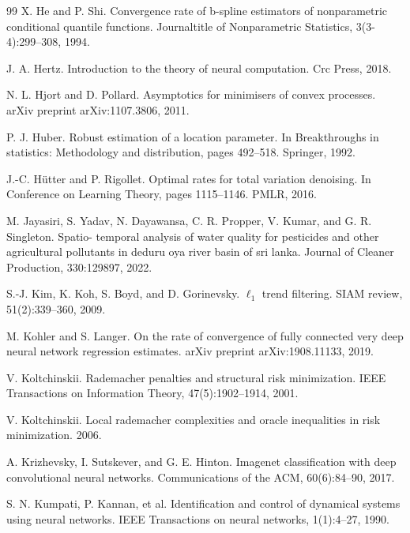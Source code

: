 \documentclass[twoside,11pt]{article}
\begin{document}
\begin{thebibliography}{99}
 X. He and P. Shi. Convergence rate of b-spline estimators of nonparametric conditional quantile functions. Journaltitle of Nonparametric Statistics, 3(3-4):299--308, 1994.

 J. A. Hertz. Introduction to the theory of neural computation. Crc Press, 2018.

 N. L. Hjort and D. Pollard. Asymptotics for minimisers of convex processes. arXiv preprint arXiv:1107.3806, 2011.

 P. J. Huber. Robust estimation of a location parameter. In Breakthroughs in statistics: Methodology and distribution, pages 492--518. Springer, 1992.

 J.-C. Hütter and P. Rigollet. Optimal rates for total variation denoising. In Conference on Learning Theory, pages 1115--1146. PMLR, 2016.

 M. Jayasiri, S. Yadav, N. Dayawansa, C. R. Propper, V. Kumar, and G. R. Singleton. Spatio- temporal analysis of water quality for pesticides and other agricultural pollutants in deduru oya river basin of sri lanka. Journal of Cleaner Production, 330:129897, 2022.

 S.-J. Kim, K. Koh, S. Boyd, and D. Gorinevsky. $\ell_1$ trend filtering. SIAM review, 51(2):339--360, 2009.

 M. Kohler and S. Langer. On the rate of convergence of fully connected very deep neural network regression estimates. arXiv preprint arXiv:1908.11133, 2019.

 V. Koltchinskii. Rademacher penalties and structural risk minimization. IEEE Transactions on Information Theory, 47(5):1902--1914, 2001.

 V. Koltchinskii. Local rademacher complexities and oracle inequalities in risk minimization. 2006.

 A. Krizhevsky, I. Sutskever, and G. E. Hinton. Imagenet classification with deep convolutional neural networks. Communications of the ACM, 60(6):84--90, 2017.

 S. N. Kumpati, P. Kannan, et al. Identification and control of dynamical systems using neural networks. IEEE Transactions on neural networks, 1(1):4--27, 1990.


\end{thebibliography}
\end{document}
